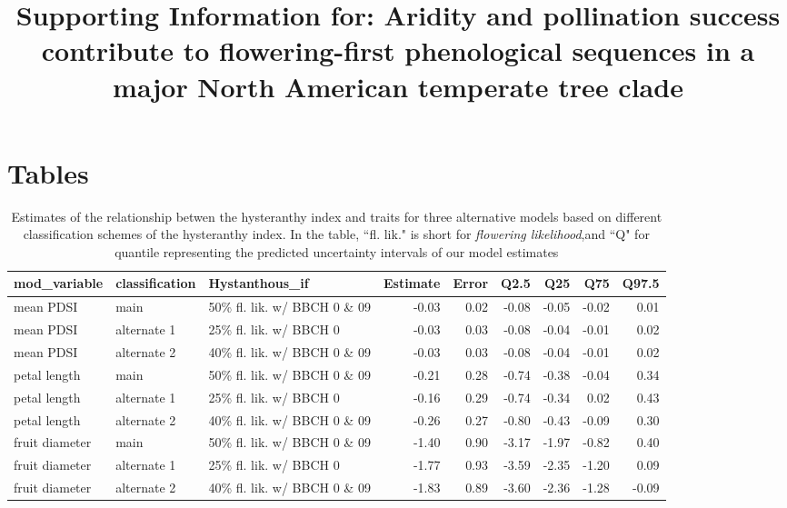 \documentclass{article}[11pt]
\title{Supporting Information for: Aridity and pollination success contribute to flowering-first phenological sequences in a major North American temperate tree clade}
\date{}
\begin{document}

\maketitle

\section*{Tables}
\begin{table}[ht]
\centering
\begin{tabular}[width=.8\textwidth]{|lllrrrrrr|}
  \hline
  mod\_variable & classification & Hystanthous\_if & Estimate & Error & Q2.5 & Q25 & Q75 & Q97.5 \\ 
  \hline
 mean PDSI & main & 50\% fl. lik. w/ BBCH 0 \& 09 & -0.03 & 0.02 & -0.08 & -0.05 & -0.02 & 0.01 \\ 
   mean PDSI & alternate 1 & 25\% fl. lik. w/ BBCH 0 & -0.03 & 0.03 & -0.08 & -0.04 & -0.01 & 0.02 \\ 
  mean PDSI & alternate 2 & 40\% fl. lik. w/ BBCH 0 \& 09 & -0.03 & 0.03 & -0.08 & -0.04 & -0.01 & 0.02 \\ 
  \hline
   petal length & main & 50\% fl. lik.  w/ BBCH 0 \& 09 & -0.21 & 0.28 & -0.74 & -0.38 & -0.04 & 0.34 \\ 
  petal length & alternate 1 & 25\% fl. lik. w/ BBCH 0 & -0.16 & 0.29 & -0.74 & -0.34 & 0.02 & 0.43 \\ 
  petal length & alternate 2 & 40\% fl. lik. w/ BBCH 0 \& 09 & -0.26 & 0.27 & -0.80 & -0.43 & -0.09 & 0.30 \\ 
 \hline
 fruit diameter & main & 50\% fl. lik.  w/ BBCH 0 \& 09 & -1.40 & 0.90 & -3.17 & -1.97 & -0.82 & 0.40 \\ 
  fruit diameter & alternate 1 & 25\% fl. lik. w/ BBCH 0 & -1.77 & 0.93 & -3.59 & -2.35 & -1.20 & 0.09 \\ 
  fruit diameter & alternate 2 & 40\% fl. lik. w/ BBCH 0 \& 09 & -1.83 & 0.89 & -3.60 & -2.36 & -1.28 & -0.09 \\ 
   \hline
\end{tabular}
\caption{Estimates of the relationship betwen the hysteranthy index and traits for three alternative models based on different classification schemes of the hysteranthy index. In the table, ``fl. lik." is short for \emph{flowering likelihood},and ``Q" for quantile representing the predicted uncertainty intervals of our model estimates }
\label{tab:modput}
\end{table}
\pagebreak
\end{document}
